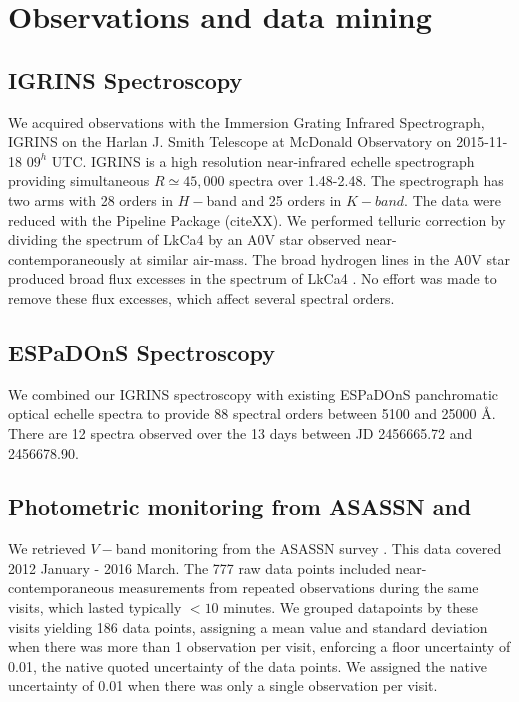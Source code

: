 \documentclass[onecolumn]{emulateapj}%
\newcommand{\name}{LkCa4 }
\begin{document}
\section{Observations and data mining}\label{sec:obs} 

\subsection{IGRINS Spectroscopy}\label{sec:igrins} 
We acquired observations with the Immersion Grating Infrared Spectrograph, IGRINS \citep{2014SPIE.9147E..1DP,2012SPIE.8450E..2SG} on the Harlan J. Smith Telescope at McDonald Observatory on 2015-11-18 $09^h$ UTC.  IGRINS is a high resolution near-infrared echelle spectrograph providing simultaneous $R\simeq45,000$ spectra over 1.48-2.48\um.  The spectrograph has two arms with 28 orders in $H-$band and 25 orders in $K-band$.  The data were reduced with the Pipeline Package (citeXX).  We performed telluric correction by dividing the spectrum of \name by an A0V star observed near-contemporaneously at similar air-mass.  The broad hydrogen lines in the A0V star produced broad flux excesses in the spectrum of \name.  No effort was made to remove these flux excesses, which affect several spectral orders. 

\subsection{ESPaDOnS Spectroscopy}
We combined our IGRINS spectroscopy with existing ESPaDOnS panchromatic optical echelle spectra to provide 88 spectral orders between 5100 and 25000 \AA \citep{2014MNRAS.444.3220D}.  There are 12 spectra observed over the 13 days between JD 2456665.72 and 2456678.90.  

\subsection{Photometric monitoring from ASASSN and \citet{grankin08}}

We retrieved $V-$band monitoring from the ASASSN survey \citep{2014ApJ...788...48S}.  This data covered 2012 January - 2016 March.  The 777 raw data points included near-contemporaneous measurements from repeated observations during the same visits, which lasted typically $<10$ minutes.  We grouped datapoints by these visits yielding 186 data points, assigning a mean value and standard deviation when there was more than 1 observation per visit, enforcing a floor uncertainty of 0.01, the native quoted uncertainty of the data points.  We assigned the native uncertainty of 0.01 when there was only a single observation per visit.
\end{document}
